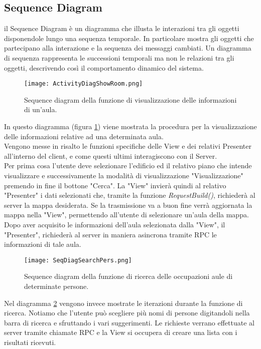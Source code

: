 \FloatBarrier
\subsection{Sequence Diagram}
il Sequence Diagram è un diagramma che illusta le interazioni tra gli oggetti disponendole lungo una sequenza temporale. In particolare mostra gli oggetti che partecipano alla interazione e la sequenza dei messaggi cambiati.
Un diagramma di sequenza rappresenta le successioni temporali ma non le relazioni tra gli oggetti, descrivendo così il comportamento dinamico del sistema.
\begin{figure}[!htb]
\centering%
\texttt{[image: ActivityDiagShowRoom.png]}%
\caption{Sequence diagram della funzione di visualizzazione delle informazioni di un'aula.}\label{fig:umlSeqDRoomInfo}%
\end{figure}
\FloatBarrier
In questo diagramma (figura \ref{fig:umlSeqDRoomInfo}) viene mostrata la procedura per la visualizzazione delle informazioni relative ad una determinata aula. \\
Vengono messe in risalto le funzioni specifiche delle View e dei relativi Presenter all'interno del client, e come questi ultimi interagiscono con il Server.\\
Per prima cosa l'utente deve selezionare l'edificio ed il relativo piano che intende visualizzare e successivamente la modalità di visualizzazione "Visualizzazione" premendo in fine il bottone "Cerca". La "View" invierà quindi al relativo "Presenter" i dati selezionati che, tramite la funzione \emph{RequestBuild()}, richiederà al server la mappa desiderata. Se la trasmissione va a buon fine verrà aggiornata la mappa nella "View", permettendo all'utente di selezionare un'aula  della mappa. Dopo aver acquisito le informazioni dell'aula selezionata dalla "View", il "Presenter", richiederà al server in maniera asincrona tramite RPC le informazioni di tale aula.

\begin{figure}[!htb]
\centering
\texttt{[image: SeqDiagSearchPers.png]}
\caption{Sequence diagram della funzione di ricerca delle occupazioni aule di determinate persone.}
\label{fig:umlSeqDSearchPerson}
\end{figure}
\FloatBarrier
Nel diagramma \ref{fig:umlSeqDSearchPerson} vengono invece mostrate le iterazioni durante la funzione di ricerca. Notiamo che l'utente può scegliere più nomi di persone digitandoli nella barra di ricerca e sfruttando i vari suggerimenti. Le richieste verrano effettuate al server tramite chiamate RPC e la View si occupera di creare una lista con i risultati ricevuti.